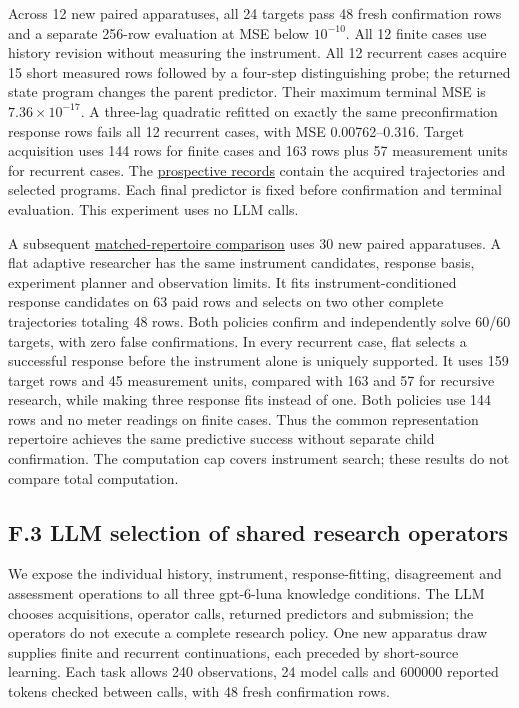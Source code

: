 \documentclass[twoside,11pt]{article}
\begin{document}
Across 12 new paired apparatuses, all 24 targets pass 48 fresh confirmation rows
and a separate 256-row evaluation at MSE below \(10^{-10}\). All 12 finite cases
use history revision without measuring the instrument. All 12 recurrent cases
acquire 15 short measured rows followed by a four-step distinguishing probe;
the returned state program changes the parent predictor. Their maximum terminal
MSE is \(7.36\times10^{-17}\). A three-lag quadratic refitted on exactly the same
preconfirmation response rows fails all 12 recurrent cases, with MSE
0.00762--0.316. Target acquisition uses 144 rows for finite cases and 163 rows
plus 57 measurement units for recurrent cases. The
\hyperlink{artifact-54}{prospective records}
contain the acquired trajectories and selected programs. Each final predictor
is fixed before confirmation and terminal evaluation. This experiment uses no
LLM calls.


A subsequent \hyperlink{artifact-55}{matched-repertoire comparison}
uses 30 new paired apparatuses. A flat adaptive researcher has the same
instrument candidates, response basis, experiment planner and observation limits.
It fits instrument-conditioned response candidates on 63 paid rows and selects
on two other complete trajectories totaling 48 rows. Both policies confirm and
independently solve 60/60 targets, with zero false confirmations. In every
recurrent case, flat selects a successful response before the instrument alone
is uniquely supported. It uses 159 target rows and 45 measurement units, compared
with 163 and 57 for recursive research, while making three response fits instead
of one. Both policies use 144 rows and no meter readings on finite cases. Thus
the common representation repertoire achieves the same predictive success
without separate child confirmation. The computation cap covers instrument
search; these results do not compare total computation.


\subsection*{F.3 LLM selection of shared research operators}

We expose the individual history, instrument, response-fitting, disagreement
and assessment operations to all three gpt-6-luna knowledge conditions. The
LLM chooses acquisitions, operator calls, returned predictors and submission;
the operators do not execute a complete research policy. One new apparatus draw
supplies finite and recurrent continuations, each preceded by short-source
learning. Each task allows 240 observations, 24 model calls and 600000 reported
tokens checked between calls, with 48 fresh confirmation rows.
\end{document}
